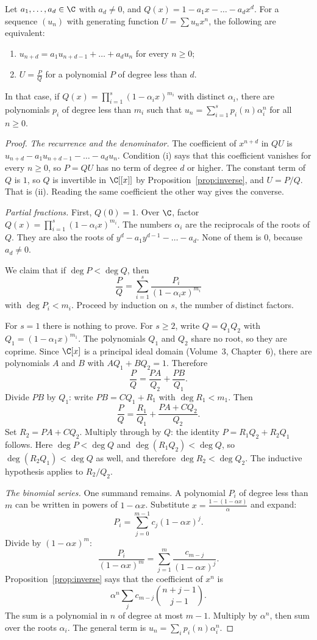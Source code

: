 \begin{theorem}\label{thm:rational}
Let $a_1,\dots,a_d\in\C$ with $a_d\ne0$, and $Q(x)=1-a_1x-\dots-a_dx^d$. For a sequence $(u_n)$ with generating
function $U=\sum u_nx^n$, the following are equivalent:
\begin{enumerate}[label=(\roman*)]
\item $u_{n+d}=a_1u_{n+d-1}+\dots+a_du_n$ for every $n\ge0$;
\item $U=\frac PQ$ for a polynomial $P$ of degree less than $d$.
\end{enumerate}
In that case, if $Q(x)=\prod_{i=1}^s(1-\alpha_ix)^{m_i}$ with distinct $\alpha_i$, there are polynomials $p_i$ of degree less
than $m_i$ such that $u_n=\sum_{i=1}^sp_i(n)\alpha_i^n$ for all $n\ge0$.
\end{theorem}
\begin{proof}
\emph{The recurrence and the denominator.}
The coefficient of $x^{n+d}$ in $QU$ is $u_{n+d}-a_1u_{n+d-1}-\dots-a_du_n$. Condition (i) says that this coefficient vanishes for every $n\ge0$, so $P=QU$ has no term of degree $d$ or higher. The constant term of $Q$ is $1$, so $Q$ is invertible in $\C[[x]]$ by Proposition~\ref{prop:inverse}, and $U=P/Q$. That is (ii). Reading the same coefficient the other way gives the converse.

\emph{Partial fractions.}
First, $Q(0)=1$. Over $\C$, factor $Q(x)=\prod_{i=1}^s(1-\alpha_ix)^{m_i}$. The numbers $\alpha_i$ are the reciprocals of the roots of $Q$. They are also the roots of $y^d-a_1y^{d-1}-\dots-a_d$. None of them is $0$, because $a_d\ne0$.

We claim that if $\deg P<\deg Q$, then
\[
\frac PQ=\sum_{i=1}^s\frac{P_i}{(1-\alpha_ix)^{m_i}}
\]
with $\deg P_i<m_i$. Proceed by induction on $s$, the number of distinct factors.

For $s=1$ there is nothing to prove. For $s\ge2$, write $Q=Q_1Q_2$ with $Q_1=(1-\alpha_1x)^{m_1}$. The polynomials $Q_1$ and $Q_2$ share no root, so they are coprime. Since $\C[x]$ is a principal ideal domain (Volume~3, Chapter~6), there are polynomials $A$ and $B$ with $AQ_1+BQ_2=1$. Therefore
\[
\frac PQ=\frac{PA}{Q_2}+\frac{PB}{Q_1}.
\]
Divide $PB$ by $Q_1$: write $PB=CQ_1+R_1$ with $\deg R_1<m_1$. Then
\[
\frac PQ=\frac{R_1}{Q_1}+\frac{PA+CQ_2}{Q_2}.
\]
Set $R_2=PA+CQ_2$. Multiply through by $Q$: the identity $P=R_1Q_2+R_2Q_1$ follows. Here $\deg P<\deg Q$ and $\deg(R_1Q_2)<\deg Q$, so $\deg(R_2Q_1)<\deg Q$ as well, and therefore $\deg R_2<\deg Q_2$. The inductive hypothesis applies to $R_2/Q_2$.

\emph{The binomial series.}
One summand remains. A polynomial $P_i$ of degree less than $m$ can be written in powers of $1-\alpha x$. Substitute $x=\frac{1-(1-\alpha x)}\alpha$ and expand:
\[
P_i=\sum_{j=0}^{m-1}c_j(1-\alpha x)^j.
\]
Divide by $(1-\alpha x)^m$:
\[
\frac{P_i}{(1-\alpha x)^m}=\sum_{j=1}^m\frac{c_{m-j}}{(1-\alpha x)^j}.
\]
Proposition~\ref{prop:inverse} says that the coefficient of $x^n$ is
\[
\alpha^n\sum_jc_{m-j}\binom{n+j-1}{j-1}.
\]
The sum is a polynomial in $n$ of degree at most $m-1$. Multiply by $\alpha^n$, then sum over the roots $\alpha_i$. The general term is $u_n=\sum_ip_i(n)\alpha_i^n$.
\end{proof}

